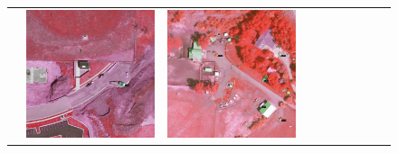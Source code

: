 \begin{figure}[H]
\begin{tabularx}{\textwidth}{c|*{9}{X}}
    & \includegraphics[trim={440pt 360pt 460pt 555pt},clip,width=\linewidth]{images/015Results/02perm_exp/comp_images/rirb/427.png}
    & \includegraphics[trim={740pt 420pt 180pt 510pt},clip,width=\linewidth]{images/015Results/02perm_exp/comp_images/rirb/523.png}

\end{tabularx}
\end{figure}
